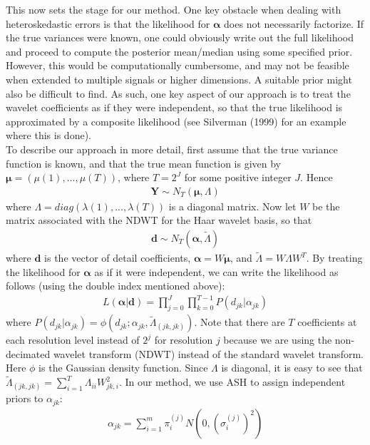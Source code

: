 \documentclass[12pt]{article}
\newcommand{\Ga}{\alpha}
\newcommand{\Gl}{\lambda}    \newcommand{\GL}{\Lambda}
\newcommand{\s}{\sigma}
\begin{document}
This now sets the stage for our method. One key obstacle when dealing with heteroskedastic errors is that the likelihood for $\bm{\Ga}$ does not necessarily factorize. If the true variances were known, one could obviously write out the full likelihood and proceed to compute the posterior mean/median using some specified prior. However, this would be computationally cumbersome, and may not be feasible when extended to multiple signals or higher dimensions. A suitable prior might also be difficult to find. As such, one key aspect of our approach is to treat the wavelet coefficients as if they were independent, so that the true likelihood is approximated by a composite likelihood (see Silverman (1999) for an example where this is done).\bigskip\\
To describe our approach in more detail, first assume that the true variance function is known, and that the true mean function is given by $\bm{\mu}=(\mu(1),...,\mu(T))$, where $T=2^J$ for some positive integer $J$. Hence
\begin{eqnarray}
\bm{Y}\sim N_T(\bm{\mu},\Lambda)
\end{eqnarray}
where $\Lambda=diag(\Gl(1),...,\Gl(T))$ is a diagonal matrix. Now let $W$ be the matrix associated with the NDWT for the Haar wavelet basis, so that
\begin{eqnarray}
\bm{d}\sim N_T(\bm{\Ga},\tilde{\Lambda})
\end{eqnarray}
where $\bm{d}$ is the vector of detail coefficients, $\bm{\Ga}=W\bm{\mu}$, and $\tilde{\Lambda}=W\Lambda W^T$. By treating the likelihood for $\bm{\Ga}$ as if it were independent, we can write the likelihood as follows (using the double index mentioned above):
\begin{eqnarray}\label{eq:likelihood}
L(\bm{\Ga}|\bm{d})=\prod_{j=0}^J\prod_{k=0}^{T-1}P(d_{jk}|\Ga_{jk})
\end{eqnarray}
where $P(d_{jk}|\Ga_{jk})=\phi(d_{jk};\Ga_{jk},\tilde{\Lambda}_{(jk,jk)})$. Note that there are $T$ coefficients at each resolution level instead of $2^j$ for resolution $j$ because we are using the non-decimated wavelet transform (NDWT) instead of the standard wavelet transform. Here $\phi$ is the Gaussian density function. Since $\Lambda$ is diagonal, it is easy to see that $\tilde{\Lambda}_{(jk,jk)}=\sum_{i=1}^T \Lambda_{ii}W_{jk,i}^2$. In our method, we use ASH to assign independent priors to $\Ga_{jk}$:
\begin{eqnarray}\label{eq:ashprior}
\Ga_{jk}=\sum_{i=1}^m \pi_i^{(j)} N(0,(\s_i^{(j)})^2)
\end{eqnarray}
\end{document}
